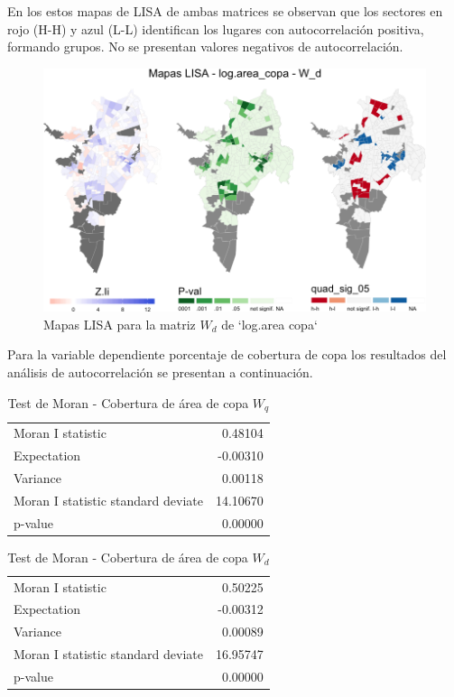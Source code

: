 \documentclass[12pt,]{book}
\begin{document}
En los estos mapas de LISA de ambas matrices se observan que los
sectores en rojo (H-H) y azul (L-L) identifican los lugares con
autocorrelación positiva, formando grupos. No se presentan valores
negativos de autocorrelación.

\begin{figure}
\includegraphics[width=1\linewidth]{tesis-unigis_files/figure-latex/mapas-lisa-copa-wd-1} \caption{Mapas LISA para la matriz $W_d$ de `log.area copa`}\label{fig:mapas-lisa-copa-wd}
\end{figure}

Para la variable dependiente porcentaje de cobertura de copa los
resultados del análisis de autocorrelación se presentan a continuación.

\begin{table}

\caption{\label{tab:moran-copaap-wq}Test de Moran - Cobertura de área de copa $W_q$}
\centering
\begin{tabular}[t]{lr}
\toprule
  &  \\
\midrule
Moran I statistic & 0.48104\\
Expectation & -0.00310\\
Variance & 0.00118\\
Moran I statistic standard deviate & 14.10670\\
p-value & 0.00000\\
\bottomrule
\end{tabular}
\end{table}

\begin{table}

\caption{\label{tab:moran-copaap-wd}Test de Moran - Cobertura de área de copa $W_d$}
\centering
\begin{tabular}[t]{lr}
\toprule
  &  \\
\midrule
Moran I statistic & 0.50225\\
Expectation & -0.00312\\
Variance & 0.00089\\
Moran I statistic standard deviate & 16.95747\\
p-value & 0.00000\\
\bottomrule
\end{tabular}
\end{table}
\end{document}
